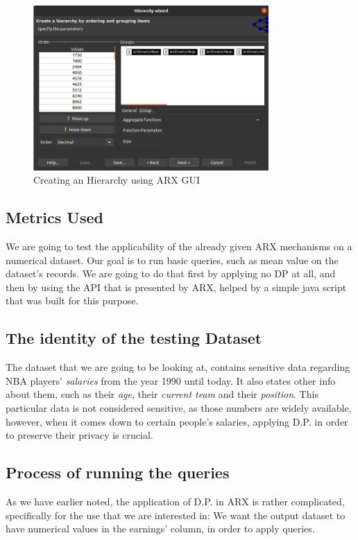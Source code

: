 \begin{figure}[!htb]\centering
    \includegraphics[width=0.8\textwidth]{images/hierarchies.png}
    \caption{Creating an Hierarchy using ARX GUI}
\end{figure}


\subsection{Metrics Used}
We are going to test the applicability of the already given ARX mechanisms on a numerical dataset. Our goal is to run basic queries, such as mean value on the dataset's records. We are going to do that first by applying no DP at all, and then by using the API that is presented by ARX, helped by a simple java script that was built for this purpose.


\subsection{The identity of the testing Dataset}
The dataset that we are going to be looking at, contains sensitive data regarding NBA players' \emph{salaries} from the year 1990 until today. It also states other info about them, such as their \emph{age}, their\emph{ current team }and their \emph{position}. This particular data is not considered sensitive, as those numbers are widely available, however, when it comes down to certain people's salaries, applying D.P. in order to preserve their privacy is crucial.

\subsection{Process of running the queries}
As we have earlier noted, the application of D.P. in ARX is rather complicated, specifically for the use that we are interested in: We want the output dataset to have numerical values in the earnings' column, in order to apply queries. 


